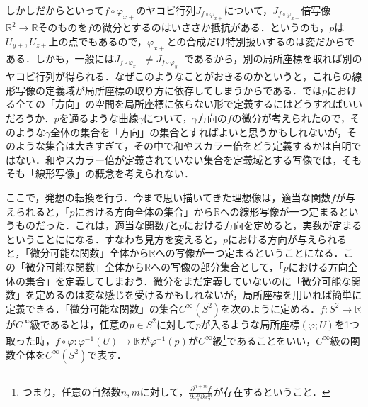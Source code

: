 \documentclass{jsarticle}
\def\realnum{{\mathbb R}}
\def\dfrac{\displaystyle\frac}
\begin{document}
しかしだからといって$f\circ \varphi_{x+}$のヤコビ行列$J_{f\circ \varphi_{x+}}$について，$J_{f\circ\varphi_{x+}}$倍写像$\realnum^2\rightarrow \realnum$そのものを$f$の微分とするのはいささか抵抗がある．というのも，$p$は$U_{y+},U_{z+}$上の点でもあるので，$\varphi_{x+}$との合成だけ特別扱いするのは変だからである．しかも，一般には$J_{f\circ\varphi_{x+}}\neq J_{f\circ\varphi_{y+}}$であるから，別の局所座標を取れば別のヤコビ行列が得られる．なぜこのようなことがおきるのかというと，これらの線形写像の定義域が局所座標の取り方に依存してしまうからである．では$p$における全ての「方向」の空間を局所座標に依らない形で定義するにはどうすればいいだろうか．$p$を通るような曲線$\gamma$について，$\gamma$方向の$f$の微分が考えられたので，そのような$\gamma$全体の集合を「方向」の集合とすればよいと思うかもしれないが，そのような集合は大きすぎて，その中で和やスカラー倍をどう定義するかは自明ではない．和やスカラー倍が定義されていない集合を定義域とする写像では，そもそも「線形写像」の概念を考えられない．


ここで，発想の転換を行う．今まで思い描いてきた理想像は，適当な関数$f$が与えられると，「$p$における方向全体の集合」から$\realnum$への線形写像が一つ定まるというものだった．これは，適当な関数$f$と$p$における方向を定めると，実数が定まるということにになる．すなわち見方を変えると，$p$における方向が与えられると，「微分可能な関数」全体から$\realnum$への写像が一つ定まるということになる．この「微分可能な関数」全体から$\realnum$への写像の部分集合として，「$p$における方向全体の集合」を定義してしまおう．微分をまだ定義していないのに「微分可能な関数」を定めるのは変な感じを受けるかもしれないが，局所座標を用いれば簡単に定義できる．「微分可能な関数」の集合$C^\infty(S^2)$を次のように定める．$f:S^2\rightarrow \realnum$が$C^{\infty}$級であるとは，任意の$p\in S^2$に対して$p$が入るような局所座標$(\varphi;U)$を1つ取った時，$f\circ\varphi:\varphi^{-1}(U)\rightarrow \realnum$が$\varphi^{-1}(p)$が$C^{\infty}$級\footnote{つまり，任意の自然数$n,m$に対して，$\dfrac{\partial^{n+m}f}{\partial x_1^n\partial x_2^m}$が存在するということ．}であることをいい，$C^\infty$級の関数全体を$C^\infty(S^2)$で表す．
\end{document}
